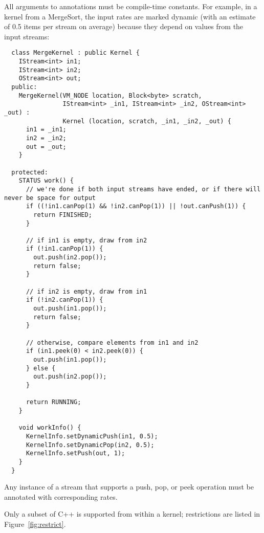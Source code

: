 All arguments to annotations must be compile-time constants.  For
example, in a kernel from a MergeSort, the input rates are marked
dynamic (with an estimate of 0.5 items per stream on average) because
they depend on values from the input streams:
{\small
\begin{verbatim}
  class MergeKernel : public Kernel {
    IStream<int> in1;
    IStream<int> in2;
    OStream<int> out;
  public:
    MergeKernel(VM_NODE location, Block<byte> scratch,
                IStream<int> _in1, IStream<int> _in2, OStream<int> _out) :
                Kernel (location, scratch, _in1, _in2, _out) {
      in1 = _in1;
      in2 = _in2;
      out = _out;
    }

  protected:
    STATUS work() {
      // we're done if both input streams have ended, or if there will never be space for output
      if ((!in1.canPop(1) && !in2.canPop(1)) || !out.canPush(1)) {
        return FINISHED;
      }

      // if in1 is empty, draw from in2
      if (!in1.canPop(1)) {          
        out.push(in2.pop());
        return false;
      }

      // if in2 is empty, draw from in1
      if (!in2.canPop(1)) {
        out.push(in1.pop());
        return false;
      } 

      // otherwise, compare elements from in1 and in2
      if (in1.peek(0) < in2.peek(0)) {
        out.push(in1.pop());
      } else {
        out.push(in2.pop());
      }

      return RUNNING;
    }

    void workInfo() {
      KernelInfo.setDynamicPush(in1, 0.5);
      KernelInfo.setDynamicPop(in2, 0.5);
      KernelInfo.setPush(out, 1);
    }
  }  
\end{verbatim}}

Any instance of a stream that supports a push, pop, or peek operation
must be annotated with corresponding rates.


Only a subset of C++ is supported from within a kernel; restrictions
are listed in Figure~\ref{fig:restrict}.  

